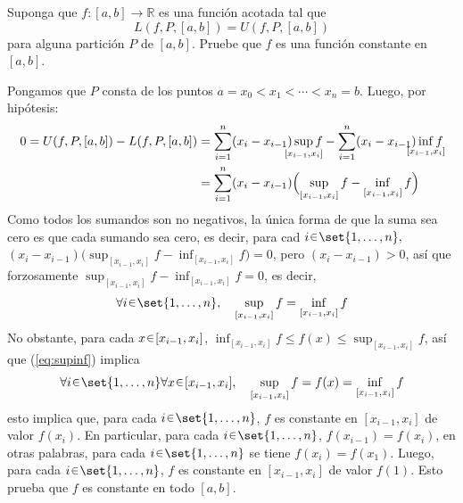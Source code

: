 
\begin{ejer}
Suponga que $f \colon [a, b] \to \mathbb{R}$ es una función acotada tal que
$$
L(f, P, [a, b]) = U(f, P, [a, b])
$$
para alguna partición $P$ de $[a, b]$. Pruebe que $f$ es una función constante en $[a, b]$.
\end{ejer}
\begin{sol}
Pongamos que $P$ consta de los puntos $a=x_0<x_1<\cdots<x_n=b$. Luego, por hipótesis:
\begin{align*}
0=U(f, P, [a, b]) - L(f, P, [a, b])%
&={ \sum^n_{i=1}(x_i - x_{i-1})\sup_{\mathclap{[x_{i-1},x_i]}} f } - { \sum^n_{i=1}(x_i - x_{i-1})\inf_{\mathclap{[x_{i-1},x_i]}} f }\\
&= \sum^n_{i=1}(x_i - x_{i-1})\Big( {\sup_{{[x_{i-1},x_i]}} f} - {\inf_{{[x_{i-1},x_i]}} f}\Big)
\end{align*}
Como todos los sumandos son no negativos, la única forma de que la suma sea cero es que cada sumando sea cero, es decir, para cad $i\en\set{1,\dots,n},$ $(x_i - x_{i-1})\big( {\sup_{{[x_{i-1},x_i]}} f} - {\inf_{{[x_{i-1},x_i]}} f}\big) = 0$, pero $(x_i - x_{i-1}) >0$, así que forzosamente ${\sup_{{[x_{i-1},x_i]}} f} - {\inf_{{[x_{i-1},x_i]}}f} = 0$, es decir, 
\begin{equation}\label{eq:supinf}
\forall i\en\set{1,\dots,n},\quad
{\sup_{{[x_{i-1},x_i]}} f} = {\inf_{{[x_{i-1},x_i]}}f}
\end{equation}
No obstante, para cada $x\en[x_{i-1},x_i]$, ${\inf_{{[x_{i-1},x_i]}}f} \leq f(x) \leq {\sup_{{[x_{i-1},x_i]}} f}$, así que (\ref{eq:supinf}) implica
\[
\forall i\en\set{1,\dots,n}\forall x \en [x_{i-1},x_i],\quad
{\sup_{{[x_{i-1},x_i]}} f} = f(x) = {\inf_{{[x_{i-1},x_i]}}f}
\]
esto implica que, para cada $i\en\set{1,\dots,n}$, $f$ es constante en $[x_{i-1},x_i]$ de valor $f(x_i)$. En particular, para cada $i\en\set{1,\dots,n}$, $f(x_{i-1}) = f(x_i)$, en otras palabras, para cada $i\en\set{1,\dots,n}$ se tiene $f(x_i) = f(x_1)$. Luego, para cada $i\en\set{1,\dots,n}$, $f$ es constante en $[x_{i-1},x_i]$ de valor $f(1)$. Esto prueba que $f$ es constante en todo $[a,b]$.
\end{sol}


